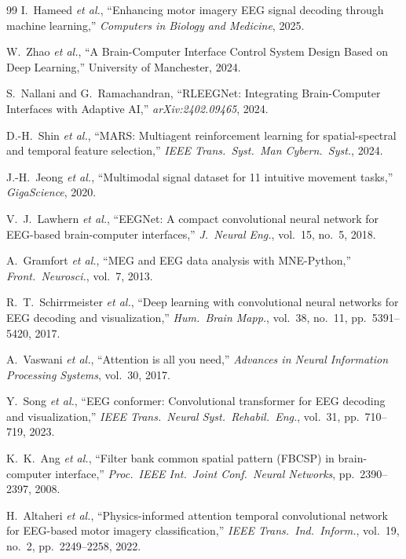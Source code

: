 \documentclass[12pt, a4paper]{article}
\begin{document}
\begin{thebibliography}{99}
I.~Hameed \emph{et al.}, ``Enhancing motor imagery EEG signal decoding through machine learning,'' \textit{Computers in Biology and Medicine}, 2025.

W.~Zhao \emph{et al.}, ``A Brain-Computer Interface Control System Design Based on Deep Learning,'' University of Manchester, 2024.

S.~Nallani and G.~Ramachandran, ``RLEEGNet: Integrating Brain-Computer Interfaces with Adaptive AI,'' \textit{arXiv:2402.09465}, 2024.

D.-H.~Shin \emph{et al.}, ``MARS: Multiagent reinforcement learning for spatial-spectral and temporal feature selection,'' \textit{IEEE Trans.\ Syst.\ Man Cybern.\ Syst.}, 2024.

J.-H.~Jeong \emph{et al.}, ``Multimodal signal dataset for 11 intuitive movement tasks,'' \textit{GigaScience}, 2020.

V.~J.~Lawhern \emph{et al.}, ``EEGNet: A compact convolutional neural network for EEG-based brain-computer interfaces,'' \textit{J.\ Neural Eng.}, vol.~15, no.~5, 2018.

A.~Gramfort \emph{et al.}, ``MEG and EEG data analysis with MNE-Python,'' \textit{Front.\ Neurosci.}, vol.~7, 2013.

R.~T.~Schirrmeister \emph{et al.}, ``Deep learning with convolutional neural networks for EEG decoding and visualization,'' \textit{Hum.\ Brain Mapp.}, vol.~38, no.~11, pp.~5391--5420, 2017.

A.~Vaswani \emph{et al.}, ``Attention is all you need,'' \textit{Advances in Neural Information Processing Systems}, vol.~30, 2017.

Y.~Song \emph{et al.}, ``EEG conformer: Convolutional transformer for EEG decoding and visualization,'' \textit{IEEE Trans.\ Neural Syst.\ Rehabil.\ Eng.}, vol.~31, pp.~710--719, 2023.

K.~K.~Ang \emph{et al.}, ``Filter bank common spatial pattern (FBCSP) in brain-computer interface,'' \textit{Proc.\ IEEE Int.\ Joint Conf.\ Neural Networks}, pp.~2390--2397, 2008.

H.~Altaheri \emph{et al.}, ``Physics-informed attention temporal convolutional network for EEG-based motor imagery classification,'' \textit{IEEE Trans.\ Ind.\ Inform.}, vol.~19, no.~2, pp.~2249--2258, 2022.


\end{thebibliography}
\end{document}
